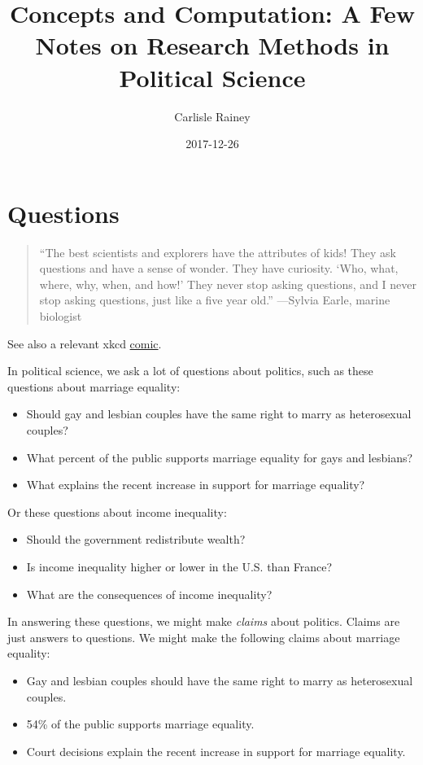 \documentclass[]{book}
\title{Concepts and Computation: A Few Notes on Research Methods in Political
Science}
\author{Carlisle Rainey}
\date{2017-12-26}
\providecommand{\tightlist}{%
  \setlength{\itemsep}{0pt}\setlength{\parskip}{0pt}}
\theoremstyle{definition}
\theoremstyle{definition}
\theoremstyle{definition}
\theoremstyle{remark}
\begin{document}
\maketitle

{
\setcounter{tocdepth}{1}
\tableofcontents
}
\chapter{Questions}\label{questions}

\begin{quote}
``The best scientists and explorers have the attributes of kids! They
ask questions and have a sense of wonder. They have curiosity. `Who,
what, where, why, when, and how!' They never stop asking questions, and
I never stop asking questions, just like a five year old.'' ---Sylvia
Earle, marine biologist
\end{quote}

See also a relevant xkcd \href{https://xkcd.com/242/}{comic}.

In political science, we ask a lot of questions about politics, such as
these questions about marriage equality:

\begin{itemize}
\tightlist
\item
  Should gay and lesbian couples have the same right to marry as
  heterosexual couples?
\item
  What percent of the public supports marriage equality for gays and
  lesbians?
\item
  What explains the recent increase in support for marriage equality?
\end{itemize}

Or these questions about income inequality:

\begin{itemize}
\tightlist
\item
  Should the government redistribute wealth?
\item
  Is income inequality higher or lower in the U.S. than France?
\item
  What are the consequences of income inequality?
\end{itemize}

In answering these questions, we might make \emph{claims} about
politics. Claims are just answers to questions. We might make the
following claims about marriage equality:

\begin{itemize}
\tightlist
\item
  Gay and lesbian couples should have the same right to marry as
  heterosexual couples.
\item
  54\% of the public supports marriage equality.
\item
  Court decisions explain the recent increase in support for marriage
  equality.
\end{itemize}
\end{document}
